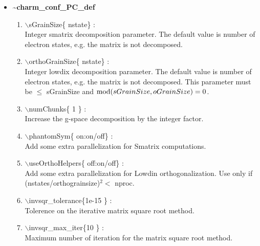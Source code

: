 \documentclass[12pt]{article}
\begin{document}
\begin{itemize}
\clearpage
\huge
\item[] {\bf \~{ }charm\_conf\_PC\_def}
\begin{enumerate}
  \vspace{0.15in} \Large
  \item $\backslash$sGrainSize\{ nstate\} : \\    \large
  Integer smatrix decomposition parameter. The default value is number of
  electron states, e.g. the matrix is not decomposed.
  \vspace{0.15in} \Large
  \item $\backslash$orthoGrainSize\{ nstate\} : \\    \large
  Integer lowdix decomposition parameter. The default value is number of
  electron states, e.g. the matrix is not decomposed. This parameter
  must be $\leq$ sGrainSize and ${\rm mod}(sGrainSize,oGrainSize)=0$.
  \vspace{0.15in} \Large
  \item $\backslash$numChunks\{ 1 \} : \\    \large
  Increase the g-space decomposition by the integer factor.
  \vspace{0.15in} \Large
  \item $\backslash$phantomSym\{ on:on/off\} : \\    \large
  Add some extra parallelization for Smatrix computations.
  \vspace{0.15in} \Large
  \item $\backslash$useOrthoHelpers\{ off:on/off\} : \\    \large
  Add some extra parallelization for Lowdin orthogonalization.
  Use only if (nstates/orthograinsize)$^2<$ nproc.
  \vspace{0.15in} \Large
  \item $\backslash$invsqr\_tolerance\{1e-15 \} : \\    \large
  Tolerence on the iterative matrix square root method.
  \vspace{0.15in} \Large
  \item $\backslash$invsqr\_max\_iter\{10 \} : \\    \large
  Maximum number of iteration for the matrix square root method.
\end{enumerate}


\end{itemize}
\end{document}
